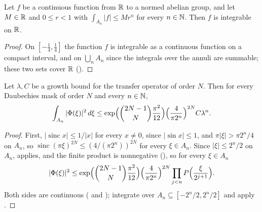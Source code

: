 \begin{lemma}
\label{lem:daub-annulus-integrable}
\leanok
{}
Let $f$ be a continuous function from $\mathbb{R}$ to a normed abelian group, and let $M \in \mathbb{R}$ and
$0 \leq r < 1$ with $\int_{A_n} |f| \leq M r^n$ for every $n \in \mathbb{N}$. Then $f$ is integrable on
$\mathbb{R}$.
\end{lemma}

\begin{proof}
\leanok
On $[-\frac14, \frac14]$ the function $f$ is integrable as a continuous function on a compact
interval, and on $\bigcup_n A_n$ since the integrals over the annuli are summable; these two
sets cover $\mathbb{R}$ ().
\end{proof}

\begin{proposition}
\label{prop:daub-annulus-integral}
\leanok
{}
Let $\lambda, C$ be a growth bound for the transfer operator of order $N$. Then for every
Daubechies mask of order $N$ and every $n \in \mathbb{N}$,
\[
  \int_{A_n} |\Phi(\xi)|^2 \, d\xi
  \leq \exp\Bigl(\binom{2N-1}{N} \frac{\pi^2}{12}\Bigr)
  \Bigl(\frac{4}{\pi 2^n}\Bigr)^{2N} C \lambda^n .
\]
\end{proposition}

\begin{proof}
\leanok
{}
First, $|\operatorname{sinc} x| \leq 1/|x|$ for every $x \neq 0$, since $|\sin x| \leq 1$, and
$\pi |\xi| > \pi 2^n/4$ on $A_n$, so $\operatorname{sinc}(\pi\xi)^{2N} \leq (4/(\pi 2^n))^{2N}$
for every $\xi \in A_n$. Since $|\xi| \leq 2^n/2$ on $A_n$,
 applies, and the finite product is nonnegative
(), so for every $\xi \in A_n$
\[
  |\Phi(\xi)|^2 \leq \exp\Bigl(\binom{2N-1}{N} \frac{\pi^2}{12}\Bigr)
  \Bigl(\frac{4}{\pi 2^n}\Bigr)^{2N} \prod_{j<n} P\Bigl(\frac{\xi}{2^{j+1}}\Bigr) .
\]
Both sides are continuous ( and
); integrate over $A_n \subseteq [-2^n/2, 2^n/2]$ and apply
.
\end{proof}

